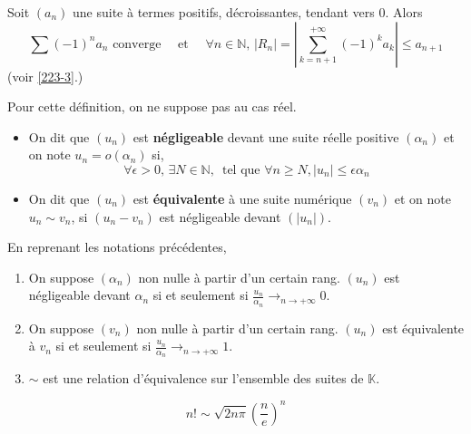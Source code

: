 
  \begin{application}
    Soit $(a_n)$ une suite à termes positifs, décroissantes, tendant vers $0$. Alors
    \[ \sum (-1)^n a_n \text{ converge} \quad \text{ et } \quad \forall n \in \mathbb{N}, \, |R_n| = \left| \sum_{k=n+1}^{+\infty} (-1)^k a_k \right| \leq a_{n+1} \]
    (voir \cref{223-3}.)
  \end{application}


	\begin{definition}
		Pour cette définition, on ne suppose pas au cas réel.
		\begin{itemize}
			\item On dit que $(u_n)$ est \textbf{négligeable} devant une suite réelle positive $(\alpha_n)$ et on note $u_n = o(\alpha_n)$ si,
			\[ \forall \epsilon > 0, \, \exists N \in \mathbb{N}, \, \text{ tel que } \forall n \geq N, \vert u_n \vert \leq \epsilon \alpha_n  \]
			\item On dit que $(u_n)$ est \textbf{équivalente} à une suite numérique $(v_n)$ et on note $u_n \sim v_n$, si $(u_n - v_n)$ est négligeable devant $(\vert u_n \vert)$.
		\end{itemize}
	\end{definition}

	\begin{proposition}
		En reprenant les notations précédentes,
		\begin{enumerate}[label=(\roman*)]
			\item On suppose $(\alpha_n)$ non nulle à partir d'un certain rang. $(u_n)$ est négligeable devant $\alpha_n$ si et seulement si $\frac{u_n}{\alpha_n} \longrightarrow_{n \rightarrow +\infty} 0$.
			\item On suppose $(v_n)$ non nulle à partir d'un certain rang. $(u_n)$ est équivalente à $v_n$ si et seulement si $\frac{u_n}{\alpha_n} \longrightarrow_{n \rightarrow +\infty} 1$.
			\item $\sim$ est une relation d'équivalence sur l'ensemble des suites de $\mathbb{K}$.
		\end{enumerate}
	\end{proposition}


	\begin{example}
		\[ n! \sim \sqrt{2n\pi} \left( \frac{n}{e} \right)^n \]
	\end{example}

